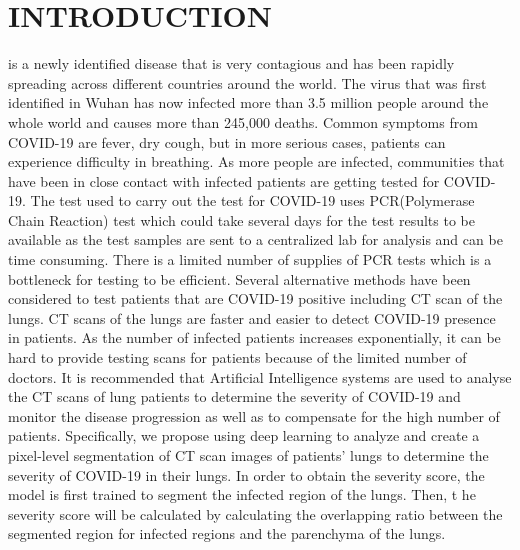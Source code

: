 \section{INTRODUCTION}

  is a newly identified disease that is very contagious and has been rapidly spreading across different countries around the world. The virus that was first identified in Wuhan has now infected more than 3.5 million people around the whole world and causes more than 245,000 deaths. Common symptoms from COVID-19 are fever, dry cough, but in more serious cases, patients can experience difficulty in breathing. As more people are infected, communities that have been in close contact with infected patients are getting tested for COVID-19. The test used to carry out the test for COVID-19 uses PCR(Polymerase Chain Reaction) test which could take several days for the test results to be available as the test samples are sent to a centralized lab for analysis and can be time consuming. There is a limited number of supplies of PCR tests which is a bottleneck for testing to be efficient. Several alternative methods have been considered to test patients that are COVID-19 positive including CT scan of the lungs. CT scans of the lungs are faster and easier to detect COVID-19 presence in patients. As the number of infected patients increases exponentially, it can be hard to provide testing scans for patients because of the limited number of doctors. It is recommended that Artificial Intelligence systems are used to analyse the CT scans of lung patients to determine the severity of COVID-19 and monitor the disease progression as well as to compensate for the high number of patients. Specifically, we propose using deep learning to analyze and create a pixel-level segmentation of CT scan images of patients’ lungs to determine the severity of COVID-19 in their lungs. In order to obtain the severity score, the model is first trained to segment the infected region of the lungs. Then, t	he severity score will be calculated by calculating the overlapping ratio between the segmented region for infected regions and the parenchyma of the lungs. 
